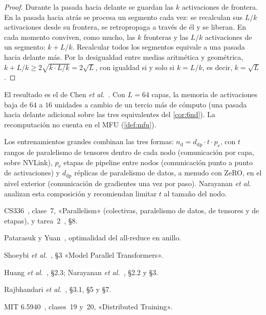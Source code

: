 \begin{proof}
Durante la pasada hacia delante se guardan las $k$ activaciones de frontera. En la pasada hacia atrás se procesa un segmento cada vez: se recalculan sus $L/k$ activaciones desde su frontera, se retropropaga a través de él y se liberan. En cada momento conviven, como mucho, las $k$ fronteras y las $L/k$ activaciones de un segmento: $k+L/k$. Recalcular todos los segmentos equivale a una pasada hacia delante más. Por la desigualdad entre medias aritmética y geométrica, $k+L/k\ge 2\sqrt{k\cdot L/k}=2\sqrt{L}$, con igualdad si y solo si $k=L/k$, es decir, $k=\sqrt{L}$.
\end{proof}

El resultado es el de Chen \emph{et al.}~\cite{chen-checkpoint}. Con $L=64$ capas, la memoria de activaciones baja de $64$ a $16$ unidades a cambio de un tercio más de cómputo (una pasada hacia delante adicional sobre las tres equivalentes del \cref{cor:6nd}). La recomputación no cuenta en el MFU (\cref{def:mfu}).

\begin{observacion}[Paralelismo 3D]
Los entrenamientos grandes combinan las tres formas: $n_{\mathrm{d}}=d_{\mathrm{dp}}\cdot t\cdot p_{\mathrm{e}}$, con $t$ rangos de paralelismo de tensores dentro de cada nodo (comunicación por capa, sobre NVLink), $p_{\mathrm{e}}$ etapas de pipeline entre nodos (comunicación punto a punto de activaciones) y $d_{\mathrm{dp}}$ réplicas de paralelismo de datos, a menudo con ZeRO, en el nivel exterior (comunicación de gradientes una vez por paso). Narayanan \emph{et al.}~\cite[§3]{narayanan} analizan esta composición y recomiendan limitar $t$ al tamaño del nodo.
\end{observacion}

\begin{lecturas}
\item CS336~\cite{cs336}, clase~7, «Parallelism» (colectivas, paralelismo de datos, de tensores y de etapas), y tarea~2~\cite{cs336a2}, §8.
\item Patarasuk y Yuan~\cite{patarasuk}, optimalidad del all-reduce en anillo.
\item Shoeybi \emph{et al.}~\cite{megatron}, §3 «Model Parallel Transformers».
\item Huang \emph{et al.}~\cite{gpipe}, §2.3; Narayanan \emph{et al.}~\cite{narayanan}, §2.2 y §3.
\item Rajbhandari \emph{et al.}~\cite{zero}, §3.1, §5 y §7.
\item MIT 6.5940~\cite{mit65940}, clases~19 y~20, «Distributed Training».
\end{lecturas}

